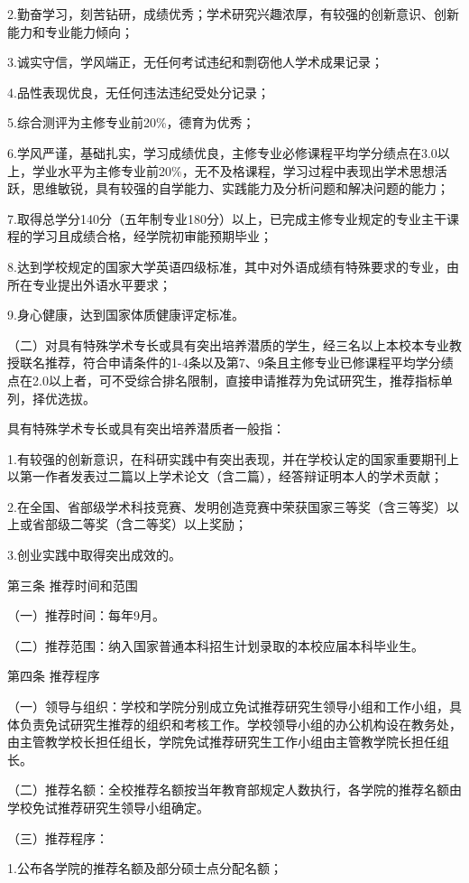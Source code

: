 \documentclass[UTF8,12pt,a4paper]{report}
\begin{document}
2.勤奋学习，刻苦钻研，成绩优秀；学术研究兴趣浓厚，有较强的创新意识、创新能力和专业能力倾向；

3.诚实守信，学风端正，无任何考试违纪和剽窃他人学术成果记录；

4.品性表现优良，无任何违法违纪受处分记录；

5.综合测评为主修专业前20\%，德育为优秀；

6.学风严谨，基础扎实，学习成绩优良，主修专业必修课程平均学分绩点在3.0以上，学业水平为主修专业前20\%，无不及格课程，学习过程中表现出学术思想活跃，思维敏锐，具有较强的自学能力、实践能力及分析问题和解决问题的能力；

7.取得总学分140分（五年制专业180分）以上，已完成主修专业规定的专业主干课程的学习且成绩合格，经学院初审能预期毕业；

8.达到学校规定的国家大学英语四级标准，其中对外语成绩有特殊要求的专业，由所在专业提出外语水平要求；

9.身心健康，达到国家体质健康评定标准。

（二）对具有特殊学术专长或具有突出培养潜质的学生，经三名以上本校本专业教授联名推荐，符合申请条件的1-4条以及第7、9条且主修专业已修课程平均学分绩点在2.0以上者，可不受综合排名限制，直接申请推荐为免试研究生，推荐指标单列，择优选拔。

具有特殊学术专长或具有突出培养潜质者一般指：

1.有较强的创新意识，在科研实践中有突出表现，并在学校认定的国家重要期刊上以第一作者发表过二篇以上学术论文（含二篇），经答辩证明本人的学术贡献；

2.在全国、省部级学术科技竞赛、发明创造竞赛中荣获国家三等奖（含三等奖）以上或省部级二等奖（含二等奖）以上奖励；

3.创业实践中取得突出成效的。

第三条 推荐时间和范围

（一）推荐时间：每年9月。

（二）推荐范围：纳入国家普通本科招生计划录取的本校应届本科毕业生。

第四条 推荐程序

（一）领导与组织：学校和学院分别成立免试推荐研究生领导小组和工作小组，具体负责免试研究生推荐的组织和考核工作。学校领导小组的办公机构设在教务处，由主管教学校长担任组长，学院免试推荐研究生工作小组由主管教学院长担任组长。

（二）推荐名额：全校推荐名额按当年教育部规定人数执行，各学院的推荐名额由学校免试推荐研究生领导小组确定。

（三）推荐程序：

1.公布各学院的推荐名额及部分硕士点分配名额；
\end{document}
